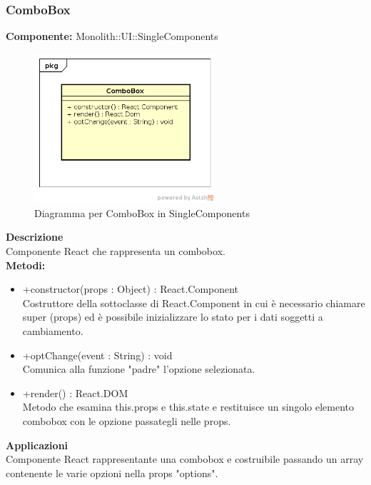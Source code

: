 \clearpage

\subsubsection{ComboBox}
\textbf{Componente:}  Monolith::UI::SingleComponents\\
   \FloatBarrier
   \begin{figure}[ht]
   \centering
   \includegraphics[width=0.6\textwidth]{img/single-ComboBox}
   \caption{{Diagramma per ComboBox in SingleComponents}}
\end{figure}
\FloatBarrier
\textbf{Descrizione}\\
Componente React che rappresenta un combobox. \\
\textbf{Metodi:} 
\begin{itemize}
\item +constructor(props : Object) : React.Component 
\\
Costruttore della sottoclasse di React.Component in cui è necessario chiamare super (props) ed è possibile inizializzare lo stato per i dati soggetti a cambiamento.

\item +optChange(event : String) : void  
\\
Comunica alla funzione "padre" l'opzione selezionata.

\item +render() : React.DOM 
\\
Metodo che esamina this.props e this.state e restituisce un singolo elemento combobox con le opzione passategli nelle props.

\end{itemize} 


\textbf{Applicazioni}\\
Componente React rappresentante una combobox e costruibile passando un array contenente le varie opzioni nella props "options". 


